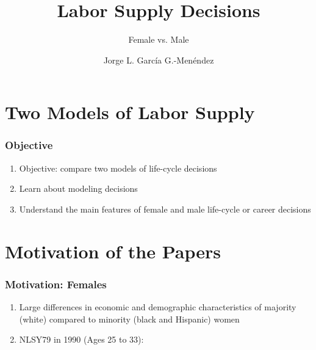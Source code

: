 

\title{Labor Supply Decisions}
\subtitle{Female vs. Male}
\author{Jorge L. Garc\'{i}a G.-Men\'{e}ndez}



\begin{frame}[plain]
	\titlepage
\end{frame}



\section{Two Models of Labor Supply}

\begin{frame}
	\frametitle{Objective}
		\begin{enumerate}
 			\item Objective: compare two models of life-cycle decisions
 			\item Learn about modeling decisions
 			\item Understand the main features of female and male life-cycle or career decisions
 		\end{enumerate}
\end{frame}

\section{Motivation of the Papers}
\begin{frame}
	\frametitle{Motivation: Females}
	\begin{enumerate}
		\item Large differences in economic and demographic characteristics of majority (white) compared to minority (black and Hispanic) women
		\item NLSY79 in 1990 (Ages 25 to 33):
	\end{enumerate}
\end{frame}

